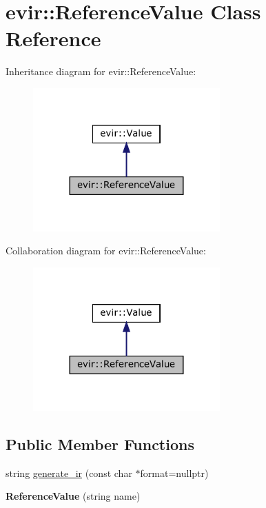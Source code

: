 \hypertarget{classevir_1_1ReferenceValue}{}\section{evir\+:\+:Reference\+Value Class Reference}
\label{classevir_1_1ReferenceValue}


Inheritance diagram for evir\+:\+:Reference\+Value\+:\nopagebreak
\begin{figure}[H]
\begin{center}
\leavevmode
\includegraphics[width=203pt]{classevir_1_1ReferenceValue__inherit__graph}
\end{center}
\end{figure}


Collaboration diagram for evir\+:\+:Reference\+Value\+:\nopagebreak
\begin{figure}[H]
\begin{center}
\leavevmode
\includegraphics[width=203pt]{classevir_1_1ReferenceValue__coll__graph}
\end{center}
\end{figure}
\subsection*{Public Member Functions}
\begin{DoxyCompactItemize}
\item 
string \hyperlink{classevir_1_1ReferenceValue_ad669613befab66578629de2ccfb8c2c3}{generate\+\_\+ir} (const char $\ast$format=nullptr)
\item 
\mbox{\label{classevir_1_1ReferenceValue_a9f20a5682fe940f5ca31cbc48ff17c84}} 
{\bfseries Reference\+Value} (string name)
\end{DoxyCompactItemize}
